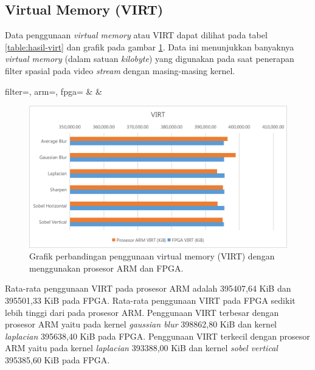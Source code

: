 \subsection{Virtual Memory (VIRT)}
Data penggunaan \textit{virtual memory} atau VIRT dapat dilihat pada tabel \ref{table:hasil-virt} dan grafik pada gambar \ref{fig:chart-virt}. Data ini menunjukkan banyaknya \textit{virtual memory} (dalam satuan \textit{kilobyte}) yang digunakan pada saat penerapan filter spasial pada video \textit{stream} dengan masing-masing kernel.
\begin{atable}
    \caption{Tabel perbandingan penggunaan virtual memory (VIRT) dengan menggunakan prosesor ARM dan FPGA.}
    \label{table:hasil-virt}
        {
            filter=\filter, 
            arm=\arm, 
            fpga=\fpga}
        {
            \filter & 
            \arm & 
            \fpga }
\end{atable}
\begin{figure}[H]
    \includegraphics[width=0.81\linewidth, center]{images/chart/chart-virt.png}
    \caption{Grafik perbandingan penggunaan virtual memory (VIRT) dengan menggunakan prosesor ARM dan FPGA.}
    \label{fig:chart-virt}
\end{figure}
Rata-rata penggunaan VIRT pada prosesor ARM adalah 395407,64 KiB dan 395501,33 KiB pada FPGA. Rata-rata penggunaan VIRT pada FPGA sedikit lebih tinggi dari pada prosesor ARM. Penggunaan VIRT terbesar dengan prosesor ARM yaitu pada kernel \textit{gaussian blur} 398862,80 KiB dan kernel \textit{laplacian} 395638,40 KiB pada FPGA. Penggunaan VIRT terkecil dengan prosesor ARM yaitu pada kernel \textit{laplacian} 393388,00 KiB dan kernel \textit{sobel vertical} 395385,60 KiB pada FPGA.

